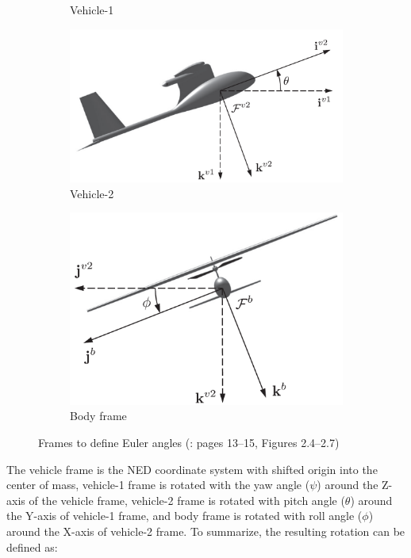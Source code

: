 \begin{figure}[!ht]
\begin{subfigure}{0.38\textwidth}
         \caption{Vehicle-1}\label{fig:vehicle-1}
    \end{subfigure}
    \begin{subfigure}{0.38\textwidth}
        \centering
         \includegraphics[width=\textwidth]{figures/vehicle-2.png}
         \caption{Vehicle-2}\label{fig:vehicle-2}
    \end{subfigure}
    \begin{subfigure}{0.38\textwidth}
        \centering
         \includegraphics[width=\textwidth]{figures/body.png}
         \caption{Body frame}\label{fig:body}
    \end{subfigure}\label{fig:frames}
    \caption{Frames to define Euler angles (\cite{EKF-UAS-2}: pages 13--15, Figures 2.4--2.7)}
\end{figure}

The vehicle frame is the NED coordinate system with shifted origin into the center of mass, vehicle-1 frame is rotated with the yaw angle ($\psi$)  around the Z-axis of the vehicle frame, vehicle-2 frame is rotated with pitch angle ($\theta$) around the Y-axis of vehicle-1 frame, and body frame is rotated with roll angle ($\phi$) around the X-axis of vehicle-2 frame. To summarize, the resulting rotation can be defined as:

